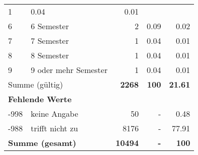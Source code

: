 \begin{longtable}{lXrrr}
       \num{1} &
       \num[round-mode=places,round-precision=2]{0.04} &
         \num[round-mode=places,round-precision=2]{0.01} \\

     6 &
     \multicolumn{1}{X}{ 6 Semester   } &


       \num{2} &
       \num[round-mode=places,round-precision=2]{0.09} &
         \num[round-mode=places,round-precision=2]{0.02} \\

     7 &
     \multicolumn{1}{X}{ 7 Semester   } &


       \num{1} &
       \num[round-mode=places,round-precision=2]{0.04} &
         \num[round-mode=places,round-precision=2]{0.01} \\

     8 &
     \multicolumn{1}{X}{ 8 Semester   } &


       \num{1} &
       \num[round-mode=places,round-precision=2]{0.04} &
         \num[round-mode=places,round-precision=2]{0.01} \\

     9 &
     \multicolumn{1}{X}{ 9 oder mehr Semester   } &


       \num{1} &
       \num[round-mode=places,round-precision=2]{0.04} &
         \num[round-mode=places,round-precision=2]{0.01} \\
     \midrule
     \multicolumn{2}{l}{Summe (gültig)} &
       \textbf{\num{2268}} &
     \textbf{\num{100}} &
       \textbf{\num[round-mode=places,round-precision=2]{21.61}} \\
     \multicolumn{5}{l}{\textbf{Fehlende Werte}}\\
       -998 &
       keine Angabe &
         \num{50} &
        - &
         \num[round-mode=places,round-precision=2]{0.48} \\
       -988 &
       trifft nicht zu &
         \num{8176} &
        - &
         \num[round-mode=places,round-precision=2]{77.91} \\
     \midrule
     \multicolumn{2}{l}{\textbf{Summe (gesamt)}} &
          \textbf{\num{10494}} &
        \textbf{-} &
        \textbf{\num{100}} \\
     \bottomrule
     \end{longtable}
     
